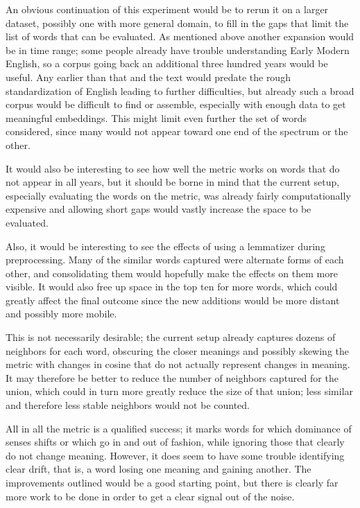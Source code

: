 \documentclass{article}
\begin{document}
An obvious continuation of this experiment would be to rerun it on a larger dataset, possibly one with more general domain, to fill in the gaps that limit the list of words that can be evaluated. As mentioned above another expansion would be in time range; some people already have trouble understanding Early Modern English, so a corpus going back an additional three hundred years would be useful. Any earlier than that and the text would predate the rough standardization of English leading to further difficulties, but already such a broad corpus would be difficult to find or assemble, especially with enough data to get meaningful embeddings. This might limit even further the set of words considered, since many would not appear toward one end of the spectrum or the other.

It would also be interesting to see how well the metric works on words that do not appear in all years, but it should be borne in mind that the current setup, especially evaluating the words on the metric, was already fairly computationally expensive and allowing short gaps would vastly increase the space to be evaluated.

Also, it would be interesting to see the effects of using a lemmatizer during preprocessing. Many of the similar words captured were alternate forms of each other, and consolidating them would hopefully make the effects on them more visible. It would also free up space in the top ten for more words, which could greatly affect the final outcome since the new additions would be more distant and possibly more mobile.

This is not necessarily desirable; the current setup already captures dozens of neighbors for each word, obscuring the closer meanings and possibly skewing the metric with changes in cosine that do not actually represent changes in meaning. It may therefore be better to reduce the number of neighbors captured for the union, which could in turn more greatly reduce the size of that union; less similar and therefore less stable neighbors would not be counted.

All in all the metric is a qualified success; it marks words for which dominance of senses shifts or which go in and out of fashion, while ignoring those that clearly do not change meaning. However, it does seem to have some trouble identifying clear drift, that is, a word losing one meaning and gaining another. The improvements outlined would be a good starting point, but there is clearly far more work to be done in order to get a clear signal out of the noise.
\end{document}
